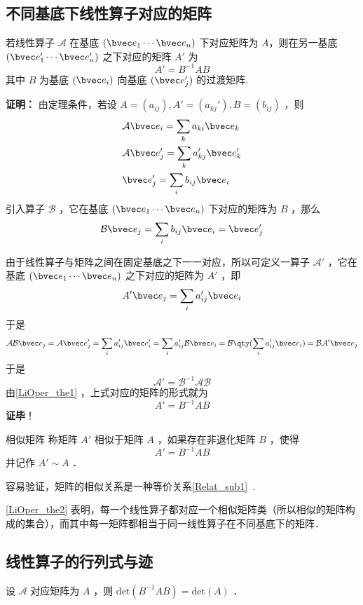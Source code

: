 \subsection{不同基底下线性算子对应的矩阵}\label{LiOper_sub1}
\begin{theorem}{}\label{LiOper_the2}
若线性算子 $\mathcal A$ 在基底 $(\bvec e_1\cdots \bvec e_n)$ 下对应矩阵为 $A$，则在另一基底  $(\bvec e'_1\cdots \bvec e'_n)$ 之下对应的矩阵 $A'$ 为
\begin{equation}
A'=B^{-1}AB
\end{equation}
其中 $B$ 为基底 $(\bvec e_i)$ 向基底 $(\bvec e_j')$ 的过渡矩阵.
\end{theorem}
\textbf{证明：}
由定理条件，若设 $A=(a_{ij}), A'=(a_{kj}'),B=(b_{ij})$ ，则
\begin{equation}
\begin{aligned}
&\mathcal{A}\bvec e_i=\sum_{k} a_{ki}\bvec e_k
\\
&\mathcal{A}\bvec e_j'=\sum_{k} a'_{kj}\bvec e'_k\\
&\bvec e_j'=\sum_i b_{ij}\bvec e_i
\end{aligned}
\end{equation}
引入算子 $\mathcal{B}$ ，它在基底 $(\bvec e_1\cdots \bvec e_n)$ 下对应的矩阵为 $B$ ，那么
\begin{equation}
\mathcal{B}\bvec e_j=\sum_i b_{ij}\bvec e_i=\bvec e_j'
\end{equation}

由于线性算子与矩阵之间在固定基底之下一一对应，所以可定义一算子 $\mathcal{A'}$ ，它在基底 $(\bvec e_1\cdots \bvec e_n)$ 之下对应的矩阵为 $A'$ ，即
\begin{equation}
A'\bvec e_j=\sum_i a'_{ij}\bvec e_i
\end{equation}
于是
\begin{equation}
\mathcal{AB}\bvec e_j=\mathcal{A}\bvec e'_j=\sum_i a'_{ij} \bvec e'_i=\sum_i a'_{ij}\mathcal{B}\bvec e_i=\mathcal{B}\qty(\sum_i a'_{ij}\bvec e_i)=\mathcal{BA'}\bvec e_j
\end{equation}
于是 
\begin{equation}
\mathcal{A'}=\mathcal{B}^{-1}\mathcal{AB}
\end{equation}
由\autoref{LiOper_the1} ，上式对应的矩阵的形式就为
\begin{equation}
A'=B^{-1}AB
\end{equation}
\textbf{证毕}！
\begin{definition}{相似矩阵}
称矩阵 $A'$ 相似于矩阵 $A$ ，如果存在非退化矩阵 $B$ ，使得
\begin{equation}
A'=B^{-1}AB
\end{equation}
并记作 $A'\sim A$ ．
\end{definition}
容易验证，矩阵的相似关系是一种等价关系\autoref{Relat_sub1}~.

\autoref{LiOper_the2} 表明，每一个线性算子都对应一个相似矩阵类（所以相似的矩阵构成的集合），而其中每一矩阵都相当于同一线性算子在不同基底下的矩阵．
\subsection{线性算子的行列式与迹}
设 $\mathcal{A}$ 对应矩阵为 $A$ ，则 $\mathrm{det}(B^{-1}AB)=\mathrm{det}(A)$ ． 

